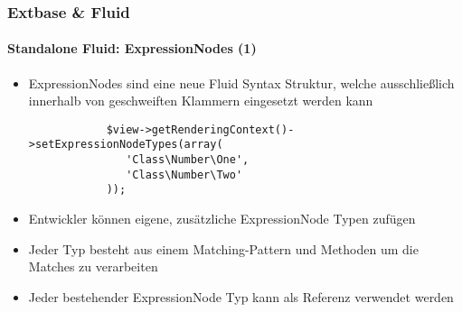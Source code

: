 
\begin{frame}[fragile]
	\frametitle{Extbase \& Fluid}
	\framesubtitle{Standalone Fluid: ExpressionNodes (1)}

	\lstset{basicstyle=\smaller\ttfamily}

	\begin{itemize}

		\item ExpressionNodes sind eine neue Fluid Syntax Struktur, welche ausschließlich innerhalb von geschweiften Klammern eingesetzt werden kann

		\begin{lstlisting}
			$view->getRenderingContext()->setExpressionNodeTypes(array(
			   'Class\Number\One',
			   'Class\Number\Two'
			));
		\end{lstlisting}

		\item Entwickler können eigene, zusätzliche ExpressionNode Typen zufügen

		\item Jeder Typ besteht aus einem Matching-Pattern und Methoden um die Matches zu verarbeiten

		\item Jeder bestehender ExpressionNode Typ kann als Referenz verwendet werden

	\end{itemize}

\end{frame}


